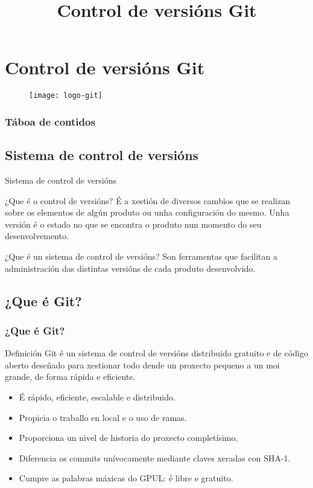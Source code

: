 
\title[Git e GitHub]{Control de versións Git}
\author[Fran Rúa e Breixo Camiña]{}

\section{Control de versións Git}
\label{sec:Git}

\begin{frame}
  \titlepage
  \begin{figure}[H]
    \centering
    \texttt{[image: logo-git]}
    \label{fig:logo-git}
  \end{figure}
\end{frame}

\begin{frame}
  \frametitle{Táboa de contidos}
  \tableofcontents[currentsection]
\end{frame}

\subsection{Sistema de control de versións}
\label{subsec:vcs}
\begin{frame}{Sistema de control de versións}
  \begin{block}{¿Que é o control de versións?}
    É a xestión de diversos cambios que se realizan sobre os elementos de algún produto ou unha configuración do mesmo. Unha versión é o estado no que se encontra o produto nun momento do seu desenvolvemento.
  \end{block}
  \begin{block}{¿Que é un sistema de control de versións?}
    Son ferramentas que facilitan a administración das distintas versións de cada produto desenvolvido.
  \end{block}
\end{frame}

\subsection{¿Que é Git?}
\begin{frame}
  \frametitle{¿Que é Git?}
  \begin{block}{Definición}
    Git é un sistema de control de versións distribuido gratuito e de código aberto deseñado para xestionar todo dende un proxecto pequeno a un moi grande, de forma rápida e eficiente.
  \end{block}
  \begin{itemize}
  \item É rápido, eficiente, escalable e distribuido.
  \item Propicia o traballo en local e o uso de ramas.
  \item Proporciona un nivel de historia do proxecto completísimo.
  \item Diferencia os commits unívocamente mediante claves xeradas con SHA-1.
  \item Cumpre as palabras máxicas do GPUL: é libre e gratuito.
  \end{itemize}
\end{frame}

